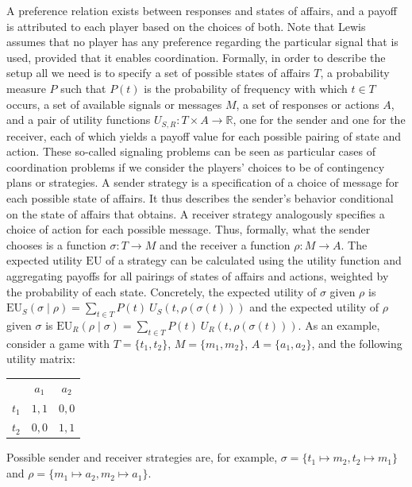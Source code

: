 \documentclass[a4paper]{article}
\begin{document}
A preference relation exists between responses and states of affairs, and a payoff is attributed to each player based on the choices of both.
Note that Lewis assumes that no player has any preference regarding the particular signal that is used, provided that it enables coordination.
Formally, in order to describe the setup all we need is to specify a set of possible states of affairs $T$, a probability measure $P$ such that $P(t)$ is the probability of frequency with which $t \in T$ occurs, a set of available signals or messages $M$, a set of responses or actions $A$, and a pair of utility functions $U_{S,R} : T \times A \rightarrow \mathbb{R}$, one for the sender and one for the receiver, each of which yields a payoff value for each possible pairing of state and action.
These so-called signaling problems can be seen as particular cases of coordination problems if we consider the players' choices to be of contingency plans or strategies.
A sender strategy is a specification of a choice of message for each possible state of affairs.
It thus describes the sender's behavior conditional on the state of affairs that obtains.
A receiver strategy analogously specifies a choice of action for each possible message.
Thus, formally, what the sender chooses is a function $\sigma : T \rightarrow M$ and the receiver a function $\rho : M \rightarrow A$.
The expected utility $\text{EU}$ of a strategy can be calculated using the utility function and aggregating payoffs for all pairings of states of affairs and actions, weighted by the probability of each state.
Concretely, the expected utility of $\sigma$ given $\rho$ is $\text{EU}_S(\sigma \mid \rho) = \sum_{t \in T} P(t) \ U_S(t, \rho(\sigma(t)))$ and the expected utility of $\rho$ given $\sigma$ is $\text{EU}_R(\rho \mid \sigma) = \sum_{t \in T} P(t) \ U_R(t, \rho(\sigma(t)))$.
As an example, consider a game with $T = \lbrace t_1, t_2 \rbrace$, $M = \lbrace m_1, m_2 \rbrace$, $A = \lbrace a_1, a_2 \rbrace$, and the following utility matrix:
\begin{center}
\begin{tabular}{r|c|c|}
\multicolumn{1}{r}{}
 & \multicolumn{1}{c}{$a_1$}
 & \multicolumn{1}{c}{$a_2$} \\ \cline{2-3}
   $t_1$ & $1,1$ & $0,0$ \\ \cline{2-3}
   $t_2$ & $0,0$ & $1,1$ \\ \cline{2-3}
\end{tabular}
\end{center}
Possible sender and receiver strategies are, for example, $\sigma = \lbrace t_1 \mapsto m_2, t_2 \mapsto m_1 \rbrace$ and $\rho = \lbrace m_1 \mapsto a_2, m_2 \mapsto a_1 \rbrace$.
\end{document}
